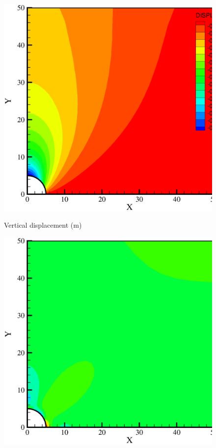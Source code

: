 \begin{figure}[!htb]
  \begin{center}
   \begin{minipage}[t]{0.45\textwidth}
     \begin{center}
    \includegraphics[scale=0.3]{M/ee_uy.eps}
    \centerline{Vertical displacement (m)}
    \end{center}
   \end{minipage}
  \hspace{0.02\textwidth}
   \begin{minipage}[t]{0.45\textwidth}
    \begin{center}
    \includegraphics[scale=0.3]{M/ee_sxx.eps}\\

\end{center}
\end{minipage}
\end{center}
\end{figure}
